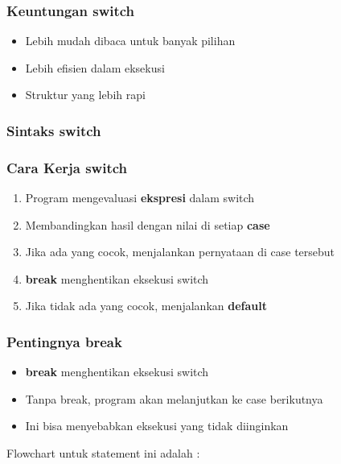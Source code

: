\subsubsection{Keuntungan switch}

\begin{itemize}
\item Lebih mudah dibaca untuk banyak pilihan
\item Lebih efisien dalam eksekusi
\item Struktur yang lebih rapi
\end{itemize}

\subsubsection{Sintaks switch}



\subsubsection{Cara Kerja switch}

\begin{enumerate}
\item Program mengevaluasi \textbf{ekspresi} dalam switch
\item Membandingkan hasil dengan nilai di setiap \textbf{case}
\item Jika ada yang cocok, menjalankan pernyataan di case tersebut
\item \textbf{break} menghentikan eksekusi switch
\item Jika tidak ada yang cocok, menjalankan \textbf{default}
\end{enumerate}

\subsubsection{Pentingnya break}

\begin{itemize}
\item \textbf{break} menghentikan eksekusi switch
\item Tanpa break, program akan melanjutkan ke case berikutnya
\item Ini bisa menyebabkan eksekusi yang tidak diinginkan
\end{itemize}

Flowchart untuk statement ini adalah :

